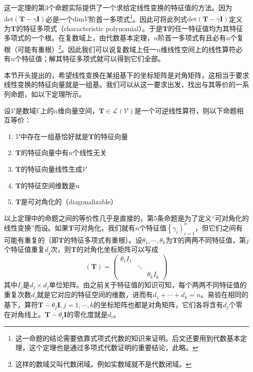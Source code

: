 \documentclass[main.tex]{subfiles}
\begin{document}
这一定理的第3个命题实际提供了一个求给定线性变换的特征值的方法。因为$\mathrm{det}\left(\mathbf{T}-\gamma\mathbf{I}\right)$必是一个$\mathrm{dim}\mathcal{V}$阶首一多项式\footnote{这一命题的结论需要依靠式项式代数的知识来证明。后文还要用到代数基本定理，这个定理也是通过多项式代数证明的重要结论，此略。}。因此可将此列式$\mathrm{det}\left(\mathbf{T}-\gamma\mathbf{I}\right)$定义为$\mathbf{T}$的特征多项式（characteristic polynomial）。于是$\mathbf{T}$的任一特征值均为其特征多项式的一个根。在复数域上，由代数基本定理，$n$阶首一多项式有且必有$n$个复根（可能有重根）\footnote{这样的数域又叫代数闭域。例如实数域就不是代数闭域。}。因此我们可以说复数域上任一$n$维线性空间上的线性算符必有$n$个特征值；解其特征多项式就可以得到它们全部。

本节开头提出的，希望线性变换在某组基下的坐标矩阵是对角矩阵，这相当于要求线性变换的特征向量就是一组基。我们可以从这一要求出发，找出与其等价的一系列命题，如以下定理所示。

\begin{theorem}
设$\mathcal{V}$是数域$\mathbb{F}$上的$n$维向量空间，$\mathbf{T}\in\mathcal{L}\left(\mathcal{V}\right)$是一个可逆线性算符，则以下命题相互等价：
\begin{enumerate}
    \item $\mathcal{V}$中存在一组基恰好就是$\mathbf{T}$的特征向量
    \item $\mathbf{T}$的特征向量中有$n$个线性无关
    \item $\mathbf{T}$的特征向量线性生成$\mathcal{V}$
    \item $\mathbf{T}$的特征空间维数是$n$
    \item $\mathbf{T}$是可对角化的（diagonalizable）
\end{enumerate}
\end{theorem}

以上定理中的命题之间的等价性几乎是直接的\cite[\S5.2“矩阵可对角化的条件”,p.123]{周胜林2012线性代数}，第5条命题是为了定义“可对角化的线性变换”而设。如果$\mathbf{T}$可对角化，我们就有$n$个特征值$\left\{\gamma_i\right)_{i=1}^n$，但它们之间有可能有重复的（即$\mathbf{T}$的特征多项式有重根）。设$\theta_1,\cdots,\theta_k$为$\mathbf{T}$的两两不同特征值，第$j$个特征值重复$d_j$次，则$\mathbf{T}$的对角化坐标矩阵可以写成
\[\left(\mathbf{T}\right)=\left(\begin{array}{ccc}\theta_1I_1&&\\&\ddots&\\&&\theta_kI_k\end{array}\right)\]
其中$I_j$是$d_j\times d_j$单位矩阵。由之前关于特征值的知识可知，每个两两不同特征值的重复次数$d_j$就是它对应的特征空间的维数，进而有$d_1+\cdots+d_k=n$。易验在相同的基下，算符$\mathbf{T}-\theta_j\mathbf{I},j=1,\cdots,k$的坐标矩阵也都是对角矩阵，它们各将含有$d_j$个零在对角线上。$\mathbf{T}-\theta_i\mathbf{I}$的零化度就是$d_i$。
\end{document}
